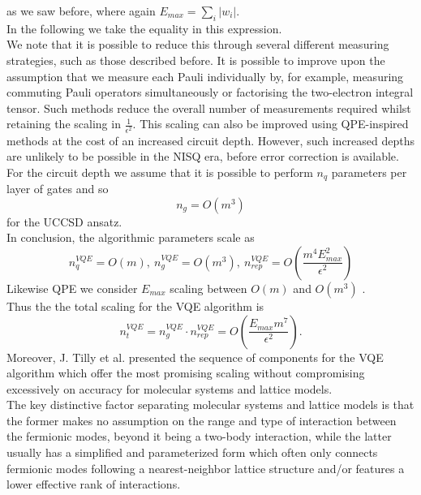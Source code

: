 as we saw before, where again $E_{max} = \sum_i |w_i|$. \\
In the following we take the equality in this expression. \\
We note that it is possible to reduce this through several different measuring strategies, such as those described before. It is possible to improve upon the assumption that we measure each Pauli individually by, for example, measuring commuting Pauli operators simultaneously or factorising the two-electron integral tensor. Such methods reduce the overall number of measurements required whilst retaining the scaling in $\frac{1}{\epsilon^2}$. This scaling can also be improved using QPE-inspired methods at the cost of an increased circuit depth. However, such increased depths are unlikely to be possible in the NISQ era, before error correction is available. \\
For the circuit depth we assume that it is possible to perform $n_q$ parameters per layer
of gates and so
\begin{equation}
    n_g = O(m^3)
\end{equation}
for the UCCSD ansatz. \\
In conclusion, the algorithmic parameters scale as \cite{Blunt2022Jun}
\begin{equation}
    n_q^{VQE} = O(m), \ n_g^{VQE} = O(m^3), \ n_{rep}^{VQE} = O \left( \frac{m^4 E_{max}^2}{\epsilon^2} \right) \label{Scaling VQE}
\end{equation}
Likewise QPE we consider $E_{max}$ scaling between $O(m)$ and $O(m^3)$ \cite{Lee2020Nov}. \\
Thus the the total scaling for the VQE algorithm is
\begin{equation}
    n_t^{VQE} = n_g^{VQE} \cdot n_{rep}^{VQE} = O \left( \frac{E_{max} m^7}{\epsilon^2} \right). \label{Scaling VQE 1}
\end{equation}
Moreover, J. Tilly et al. \cite{Tilly2021Nov} presented the sequence of components for the VQE algorithm which offer the most promising scaling without compromising excessively on accuracy for molecular systems and lattice models. \\
The key distinctive factor separating molecular systems and lattice models is that the former makes no assumption on the range and type of interaction between the fermionic modes, beyond it being a two-body interaction, while the latter usually has a simplified and parameterized form which often only connects fermionic modes following a nearest-neighbor lattice structure and/or features a lower effective rank of interactions. \\

